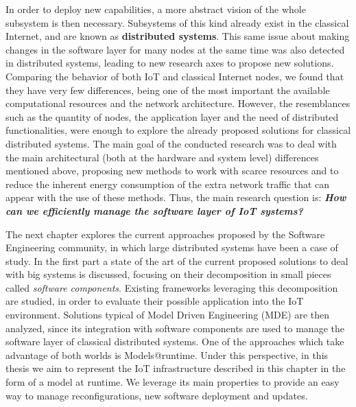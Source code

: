 In order to deploy new capabilities, a more abstract vision of the whole subsystem is then necessary.
Subsystems of this kind already exist in the classical Internet, and are known as \textbf{distributed systems}\cite{coulouris2005distributed}.
This same issue about making changes in the software layer for many nodes at the same time was also detected in distributed systems, leading to new research axes to propose new solutions.
Comparing the behavior of both IoT and classical Internet nodes, we found that they have very few differences, being one of the most important the available computational resources and the network architecture.
However, the resemblances such as the quantity of nodes, the application layer and the need of distributed functionalities, were enough to explore the already proposed solutions for classical distributed systems.
The main goal of the conducted research was to deal with the main architectural (both at the hardware and system level) differences mentioned above, proposing new methods to work with scarce resources and to reduce the inherent energy consumption of the extra network traffic that can appear with the use of these methods.
Thus, the main research question is: \textit{\textbf{How can we efficiently manage the software layer of IoT systems?}}

The next chapter explores the current approaches proposed by the Software Engineering community, in which large distributed systems have been a case of study.
In the first part a state of the art of the current proposed solutions to deal with big systems is discussed, focusing on their decomposition in small pieces called \textit{software components}.
Existing frameworks leveraging this decomposition are studied, in order to evaluate their possible application into the IoT environment.
Solutions typical of Model Driven Engineering (MDE) are then analyzed, since its integration with software components are used to manage the software layer of classical distributed systems.
One of the approaches which take advantage of both worlds is Models@runtime\cite{morin2009mar}.
Under this perspective, in this thesis we aim to represent the IoT infrastructure described in this chapter in the form of a model at runtime.
We leverage its main properties to provide an easy way to manage reconfigurations, new software deployment and updates.


